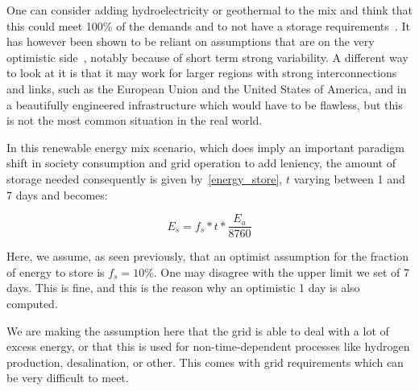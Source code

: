 One can consider adding hydroelectricity or geothermal to the mix and think that this could meet 100\% of the demands and to not have a storage requirements~. It has however been shown to be reliant on assumptions that are on the very optimistic side~, notably because of short term strong variability. A different way to look at it is that it may work for larger regions with strong interconnections and links, such as the European Union and the United States of America, and in a beautifully engineered infrastructure which would have to be flawless, but this is not the most common situation in the real world.



\begin{remark}

In this renewable energy mix scenario, which does imply an important paradigm shift in society consumption and grid operation to add leniency, the amount of storage needed consequently is given by~\ref{energy_store}, $t$ varying between 1 and 7 days and becomes:

\begin{equation}\label{energy_store}
E_s = f_s * t * \frac{E_a}{8760}
\end{equation}

Here, we assume, as seen previously, that an optimist assumption for the fraction of energy to store is $f_s = 10\%$. One may disagree with the upper limit we set of 7 days. This is fine, and this is the reason why an optimistic 1 day is also computed.


\end{remark}

We are making the assumption here that the grid is able to deal with a lot of excess energy, or that this is used for non-time-dependent processes like hydrogen production, desalination, or other. This comes with grid requirements which can be very difficult to meet.

